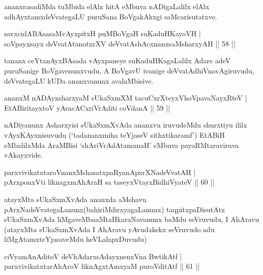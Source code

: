 \begin{artha}
ananxrasadiMda tuMbida elAlx hitA eMbuva nADigaLalilx elAlx adhAyxtamxdeVvategaLU puruSana BoVgakAkxgi saMcarisutatxve.
\end{artha}


\begin{shl}
savxcidABAsasaMvAyxpitxH puMBoVgaH suKaduHKayoVH |\\
soV\s payxsayx deVvatAtanotxrXV deVvatAshAcxnanxsaMsharxyAH \hfill || 58 || 
\end{shl}

\begin{artha}
tananx ceYtanAyxBAsada vAyxpaneye suKaduHKagaLalilx Adare adeV puruSanige BoVgavenunxvudu, A BoVgavU ivanige deVvatAdhiVnavAgiruvudu, deVvategaLU kUDa ananxvanunx avalaMbisive.
\end{artha}

\begin{shl}
ananxM nADAyxsharxyaM sUkaSxmXM tacuCxrXteyxVhoVpavaNayxRteV |\\
EtABiritayxtoV yAvacACxriVrAditi coVdanA \hfill || 59 || 
\end{shl}

\begin{artha}
nADiyanunx Asharxyisi sUkaSxmXvAda ananxvu iruvudeMdu shurxtiyu ililx vAyxKAyxnisuvudu (`tadananxmiha teYjaseV sithxtikaramf') EtABiH \mdash eMbalilxMda AraMBisi `shAriVrAdAtamxnaH' eMbuva payaRMtaraviruva vAkayxvide.
\end{artha}

\begin{shl}
parxvivikatxtaroV\s nanxMshasatxpaRyanApxrXNadeVvatAH |\\
pArxponxVti liknagxmAhAraH sa taseyxVtayxBidhiVyateV \hfill || 60 || 
\end{shl}

\begin{artha}
atayxMta sUkaSxmXvAda ananxda aMshavu pArxNadeVvategaLanunx\break (bahiriMdirxyagaLanunx) taqpitxpaDisutAtx sUkaSxmXvAda liMgaveMba\break aMtaHkaraNavanunx baMdu seVruvudu, I AhAravu (atayxMta sUkaSxmXvAda I AhAravu yAvudakekx seVruvudo adu liMgAtamxteYjasaveMdu heVLalapxDuvudu)
\end{artha}

\begin{shl}
ciVyamAnAditoV deVhAdarxsAdayxnenxVna BwtikAtf |\\
parxvivikatxtarAhAroV liknAgxtAmx\s yaM puroVditAtf \hfill || 61 || 
\end{shl}

